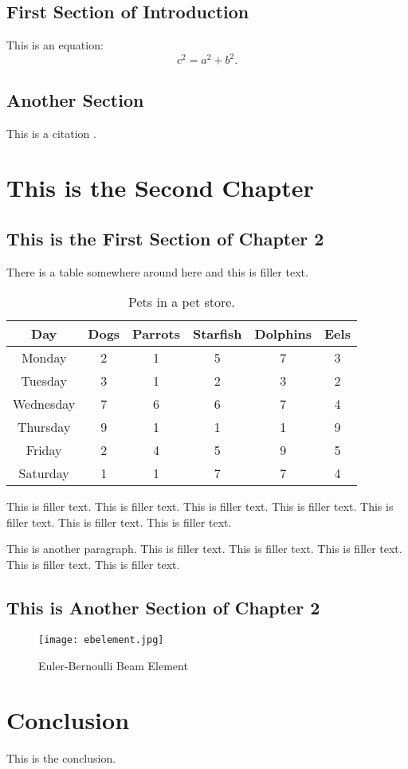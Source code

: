 \documentclass[12pt]{ucthesis}
\newcommand{\captionfonts}{\small\bf\ssp}
\begin{document}
\section{First Section of Introduction}
\label{intro1}
This is an equation:
\begin{equation}
c^2=a^2+b^2.
\end{equation}

\section{Another Section}
\label{intro2}
This is a citation \cite{comrtflms}.
 

\chapter{This is the Second Chapter}
\label{ch2}

\section{This is the First Section of Chapter 2}
\label{ch2s1}

There is a table somewhere around here and this is filler text. 
\begin{table}[ht!]
\begin{center}
\begin{tabular}{|c|c|c|c|c|c|}
\hline
Day&Dogs&Parrots&Starfish&Dolphins&Eels\tabularnewline \hline
Monday&2&1&5&7&3 \tabularnewline \hline
Tuesday&3&1&2&3&2 \tabularnewline \hline
Wednesday&7&6&6&7&4 \tabularnewline \hline
Thursday&9&1&1&1&9 \tabularnewline \hline
Friday&2&4&5&9&5 \tabularnewline \hline
Saturday&1&1&7&7&4 \tabularnewline \hline
\end{tabular}
\captionfonts
\caption[Pets]{Pets in a pet store.}
\label{table:performance}
\end{center}
\end{table}
This is filler text. This is filler text. This is filler text. This is filler text. This is filler text. This is filler text. This is filler text.
\par This is another paragraph. This is filler text. This is filler text. This is filler text. This is filler text. This is filler text.

\section{This is Another Section of Chapter 2}
\label{ch2s2}
\begin{figure}[ht!]
\begin{center}
\texttt{[image: ebelement.jpg]}
\captionfonts
\caption[Euler-Bernoulli Beam Element]{Euler-Bernoulli Beam Element}
\label{EBE}
\end{center}
\end{figure}
   
\chapter{Conclusion}
\label{Conclusion}
This is the conclusion.

\clearpage


\end{document}
